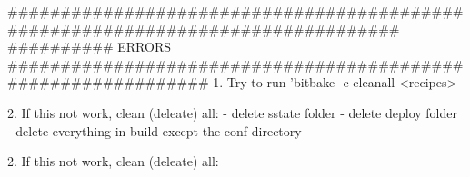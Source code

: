 

################################################################################
########## ERRORS ##############################################################
1. Try to run 'bitbake -c cleanall <recipes> 

2. If this not work, clean (deleate) all:
- delete sstate folder
- delete deploy folder
- delete everything in build except the conf directory

2. If this not work, clean (deleate) all:










